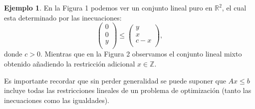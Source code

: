 \documentclass[10pt]{article}
\newcommand{\RR}{\mathbb R}
\newcommand{\ZZ}{\mathbb Z}
\theoremstyle{plain}
\theoremstyle{definition}
\newtheorem{eje}{Ejemplo}
\begin{document}
\begin{eje}

En la Figura 1 podemos ver un conjunto lineal puro en $\RR^2$, el cual esta determinado por las inecuaciones:
$$\begin{pmatrix}    
0\\ 
0\\
y\\ 
\end{pmatrix}\leq\begin{pmatrix}    
y\\ 
x\\
c-x\\ 
\end{pmatrix},
$$
donde $c>0$. Mientras que en la Figura 2 observamos el conjunto lineal mixto obtenido añadiendo la restricción adicional $x\in \ZZ$.

Es importante recordar que sin perder generalidad se puede suponer que $Ax \leq b$ incluye todas las restricciones lineales de un problema de optimización (tanto las inecuaciones como las igualdades).


\end{eje}
\end{document}

